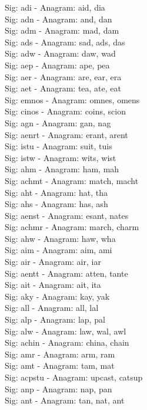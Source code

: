 Sig: {adi} - Anagram: aid, dia \\
Sig: {adn} - Anagram: and, dan \\
Sig: {adm} - Anagram: mad, dam \\
Sig: {ads} - Anagram: sad, ads, das \\
Sig: {adw} - Anagram: daw, wad \\
Sig: {aep} - Anagram: ape, pea \\
Sig: {aer} - Anagram: are, ear, era \\
Sig: {aet} - Anagram: tea, ate, eat \\
Sig: {emnos} - Anagram: omnes, omens \\
Sig: {cinos} - Anagram: coins, scion \\
Sig: {agn} - Anagram: gan, nag \\
Sig: {aenrt} - Anagram: erant, arent \\
Sig: {istu} - Anagram: suit, tuis \\
Sig: {istw} - Anagram: wits, wist \\
Sig: {ahm} - Anagram: ham, mah \\
Sig: {achmt} - Anagram: match, macht \\
Sig: {aht} - Anagram: hat, tha \\
Sig: {ahs} - Anagram: has, ash \\
Sig: {aenst} - Anagram: esant, nates \\
Sig: {achmr} - Anagram: march, charm \\
Sig: {ahw} - Anagram: haw, wha \\
Sig: {aim} - Anagram: aim, ami \\
Sig: {air} - Anagram: air, iar \\
Sig: {aentt} - Anagram: atten, tante \\
Sig: {ait} - Anagram: ait, ita \\
Sig: {aky} - Anagram: kay, yak \\
Sig: {all} - Anagram: all, lal \\
Sig: {alp} - Anagram: lap, pal \\
Sig: {alw} - Anagram: law, wal, awl \\
Sig: {achin} - Anagram: china, chain \\
Sig: {amr} - Anagram: arm, ram \\
Sig: {amt} - Anagram: tam, mat \\
Sig: {acpstu} - Anagram: upcast, catsup \\
Sig: {anp} - Anagram: nap, pan \\
Sig: {ant} - Anagram: tan, nat, ant \\
